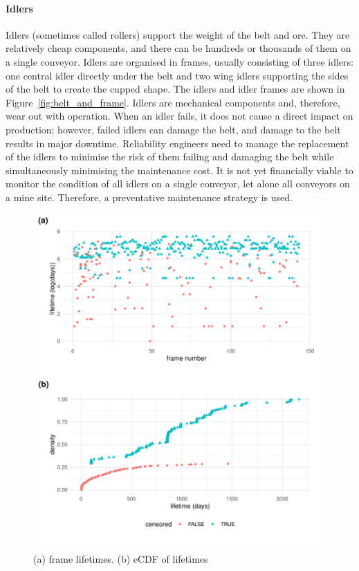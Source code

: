 \paragraph*{Idlers}

Idlers (sometimes called rollers) support the weight of the belt and ore. They are relatively cheap components, and there can be hundreds or thousands of them on a single conveyor. Idlers are organised in frames, usually consisting of three idlers: one central idler directly under the belt and two wing idlers supporting the sides of the belt to create the cupped shape. The idlers and idler frames are shown in Figure~\ref{fig:belt_and_frame}. Idlers are mechanical components and, therefore, wear out with operation. When an idler fails, it does not cause a direct impact on production; however, failed idlers can damage the belt, and damage to the belt results in major downtime. Reliability engineers need to manage the replacement of the idlers to minimise the risk of them failing and damaging the belt while simultaneously minimising the maintenance cost. It is not yet financially viable to monitor the condition of all idlers on a single conveyor, let alone all conveyors on a mine site. Therefore, a preventative maintenance strategy is used.

\begin{figure}
  \centering
  \includegraphics[width=1\textwidth]{./figures/idler_data_desc.pdf}
  \caption{(a) frame lifetimes. (b) eCDF of lifetimes}
  \label{fig:idler-data}
\end{figure}

